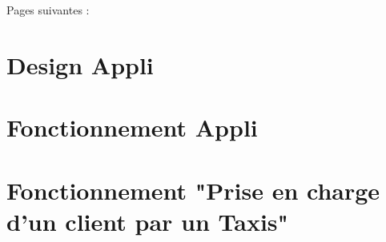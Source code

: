 \documentclass[11pt]{article} %
\begin{document}
Pages suivantes : 
\section*{Design Appli}
\section*{Fonctionnement Appli}
\section*{Fonctionnement "Prise en charge d'un client par un Taxis"}



\end{document}

